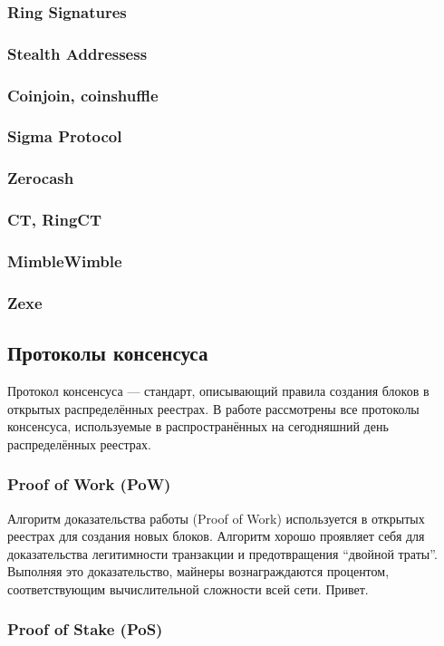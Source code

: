 \subsubsection{Ring Signatures}
\subsubsection{Stealth Addressess}
\subsubsection{Coinjoin, coinshuffle}
\subsubsection{Sigma Protocol}
\subsubsection{Zerocash}
\subsubsection{CT, RingCT}
\subsubsection{MimbleWimble}
\subsubsection{Zexe}


\subsection{Протоколы консенсуса}\label{consensus_protocols}
Протокол консенсуса --- стандарт, описывающий правила создания блоков в
открытых распределённых реестрах. В работе рассмотрены все протоколы
консенсуса, используемые в распространённых на сегодняшний день распределённых
реестрах.
\subsubsection{Proof of Work (PoW)}
Алгоритм доказательства работы (Proof of Work) используется в открытых реестрах
для создания новых блоков. Алгоритм хорошо проявляет себя для доказательства
легитимности транзакции и предотвращения ``двойной траты''.  Выполняя это
доказательство, майнеры вознаграждаются процентом, соответствующим
вычислительной сложности всей сети. Привет.
\subsubsection{Proof of Stake (PoS)}
